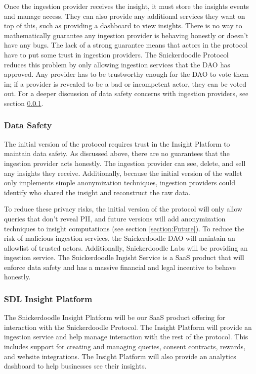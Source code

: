 Once the ingestion provider receives the insight, it must store the insights events and manage access. They can also provide any additional services 
they want on top of this, such as providing a dashboard to view insights. There is no way to mathematically guarantee any ingestion provider is behaving 
honestly or doesn't have any bugs. The lack of a strong guarantee means that actors in the protocol have to put some trust in ingestion providers. The 
Snickerdoodle Protocol reduces this problem by only allowing ingestion services that the DAO has approved. Any provider has to be trustworthy enough for 
the DAO to vote them in; if a provider is revealed to be a bad or incompetent actor, they can be voted out. For a deeper discussion of data safety 
concerns with ingestion providers, see section \ref{section:IngestionDataSafety}.

\subsubsection{Data Safety}
\label{section:IngestionDataSafety}
The initial version of the protocol requires trust in the Insight Platform to maintain data safety. As discussed above, there are no guarantees that the 
ingestion provider acts honestly. The ingestion provider can see, delete, and sell any insights they receive. Additionally, because the initial version 
of the wallet only implements simple anonymization techniques, ingestion providers could identify who shared the insight and reconstruct the raw data. 


To reduce these privacy risks, the initial version of the protocol will only allow queries that don't reveal PII, and future versions will add anonymization 
techniques to insight computations (see section \ref{section:Future}). To reduce the risk of malicious ingestion services, the Snickerdoodle DAO will maintain 
an allowlist of trusted actors. Additionally, Snickerdoodle Labs will be providing an ingestion service. The Snickerdoodle Ingisht Service is a SaaS product 
that will enforce data safety and has a massive financial and legal incentive to behave honestly.

\subsubsection{SDL Insight Platform}
\label{section:InsightService}
The Snickerdoodle Insight Platform will be our SaaS product offering for interaction with the Snickerdoodle Protocol. The Insight Platform will provide an 
ingestion service and help manage interaction with the rest of the protocol. This includes support for creating and managing queries, consent contracts, 
rewards, and website integrations. The Insight Platform will also provide an analytics dashboard to help businesses see their insights.